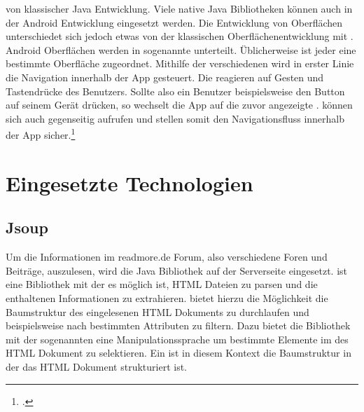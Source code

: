 von klassischer Java Entwicklung. Viele native Java Bibliotheken können auch in
der Android Entwicklung eingesetzt werden. Die Entwicklung von Oberflächen
unterschiedet sich jedoch etwas von der klassischen Oberflächenentwicklung mit
. Android Oberflächen werden in sogenannte
 unterteilt. Üblicherweise ist jeder
 eine bestimmte Oberfläche zugeordnet. Mithilfe der
verschiedenen  wird in erster Linie die Navigation
innerhalb der App gesteuert. Die  reagieren auf Gesten
und Tastendrücke des Benutzers. Sollte also ein Benutzer beispielsweise den
 Button auf seinem Gerät drücken, so wechselt die App auf
die zuvor angezeigte .  können
sich auch gegenseitig aufrufen und stellen somit
den Navigationsfluss innerhalb der App sicher.\footcite{kuenneth2012android}

\section{Eingesetzte Technologien}
\subsection{Jsoup}
Um die Informationen im readmore.de Forum, also verschiedene Foren und Beiträge,
auszulesen, wird die Java Bibliothek  auf der
Serverseite eingesetzt.
 ist eine Bibliothek mit der es möglich ist, HTML Dateien zu
parsen und die enthaltenen Informationen zu extrahieren. 
bietet hierzu die Möglichkeit die Baumstruktur des eingelesenen HTML Dokuments
zu durchlaufen und beispielsweise nach bestimmten Attributen zu filtern. Dazu
bietet die Bibliothek mit der sogenannten  eine
Manipulationssprache um bestimmte Elemente im  des HTML
Dokument zu selektieren. Ein  ist in diesem Kontext die 
Baumstruktur in der das HTML Dokument strukturiert ist. \\
